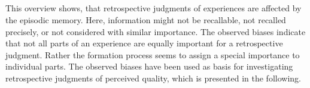 \subparagraph*{}
This overview shows, that retrospective judgments of experiences are affected by the episodic memory.
Here, information might not be recallable, not recalled precisely, or not considered with similar importance.
The observed biases indicate that not all parts of an experience are equally important for a retrospective judgment.
Rather the formation process seems to assign a special importance to individual parts.
The observed biases have been used as basis for investigating retrospective judgments of perceived quality, which is presented in the following.
